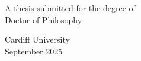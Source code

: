 


\clearpage
\thispagestyle{empty}

\begin{center}
	{\LARGE \textbf{\Title}\par}
	\vspace{3cm}
	{\LARGE \Author\par}
	\vspace{3cm}
	{\LARGE A thesis submitted for the degree of \\ Doctor  of  Philosophy\par}
	\vfill
	{\LARGE Cardiff University} \\
	\vspace{1cm}
	{\LARGE September 2025}
\end{center}